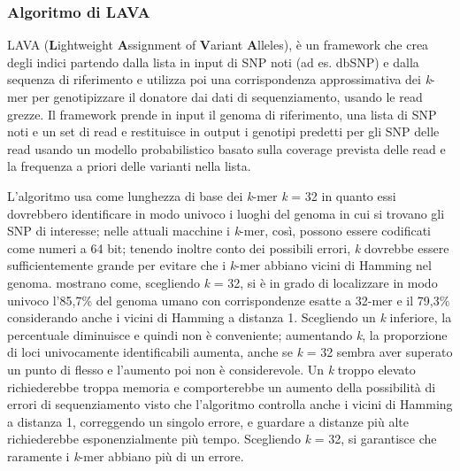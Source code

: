 \documentclass[../main.tex]{subfiles}
\begin{document}
\subsubsection{Algoritmo di LAVA}
\label{lava}
LAVA (\textbf{L}ightweight \textbf{A}ssignment of \textbf{V}ariant \textbf{A}lleles), è un framework che crea degli indici partendo dalla lista in input di SNP noti (ad es. dbSNP) e dalla sequenza di riferimento e utilizza poi una corrispondenza approssimativa dei \textit{k}-mer per genotipizzare il donatore dai dati di sequenziamento, usando le read grezze. Il framework prende in input il genoma di riferimento, una lista di SNP noti e un set di read e restituisce in output i genotipi predetti per gli SNP delle read usando un modello probabilistico basato sulla coverage prevista delle read e la frequenza a priori delle varianti nella lista. 


\noindent
L'algoritmo usa come lunghezza di base dei \textit{k}-mer \textit{k} = 32 in quanto essi dovrebbero identificare in modo univoco i luoghi del genoma in cui si trovano gli SNP di interesse; nelle attuali macchine i \textit{k}-mer, così, possono essere codificati come numeri a 64 bit; tenendo inoltre conto dei possibili errori, \textit{k} dovrebbe essere sufficientemente grande per evitare che i \textit{k}-mer abbiano vicini di Hamming nel genoma. \cite{shajii2016lava} mostrano come, scegliendo \textit{k} = 32, si è in grado di localizzare in modo univoco l'85,7\% del genoma umano con corrispondenze esatte a 32-mer e il 79,3\% considerando anche i vicini di Hamming a distanza 1. Scegliendo un \textit{k} inferiore, la percentuale diminuisce e quindi non è conveniente; aumentando \textit{k}, la proporzione di loci univocamente identificabili aumenta, anche se \textit{k} = 32 sembra aver superato un punto di flesso e l'aumento poi non è considerevole. Un \textit{k} troppo elevato richiederebbe troppa memoria e comporterebbe un aumento della possibilità di errori di sequenziamento visto che l'algoritmo controlla anche i vicini di Hamming a distanza 1, correggendo un singolo errore, e guardare a distanze più alte richiederebbe esponenzialmente più tempo. Scegliendo \textit{k} = 32, si garantisce che raramente i \textit{k}-mer abbiano più di un errore.\\
\end{document}
